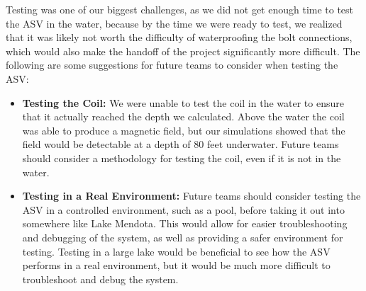 Testing was one of our biggest challenges, as we did not get enough time to test the ASV in the water, because by the time we were ready to test, we realized that it was likely not worth the difficulty of waterproofing the bolt connections, which would also make the handoff of the project significantly more difficult. The following are some suggestions for future teams to consider when testing the ASV:
\begin{itemize}
  \item \textbf{Testing the Coil:} 
    We were unable to test the coil in the water to ensure that it actually reached the depth we calculated. Above the water the coil was able to produce a magnetic field, but our simulations showed that the field would be detectable at a depth of 80 feet underwater. Future teams should consider a methodology for testing the coil, even if it is not in the water.
  \item \textbf{Testing in a Real Environment:} 
    Future teams should consider testing the ASV in a controlled environment, such as a pool, before taking it out into somewhere like Lake Mendota. This would allow for easier troubleshooting and debugging of the system, as well as providing a safer environment for testing. Testing in a large lake would be beneficial to see how the ASV performs in a real environment, but it would be much more difficult to troubleshoot and debug the system.
    
\end{itemize}

